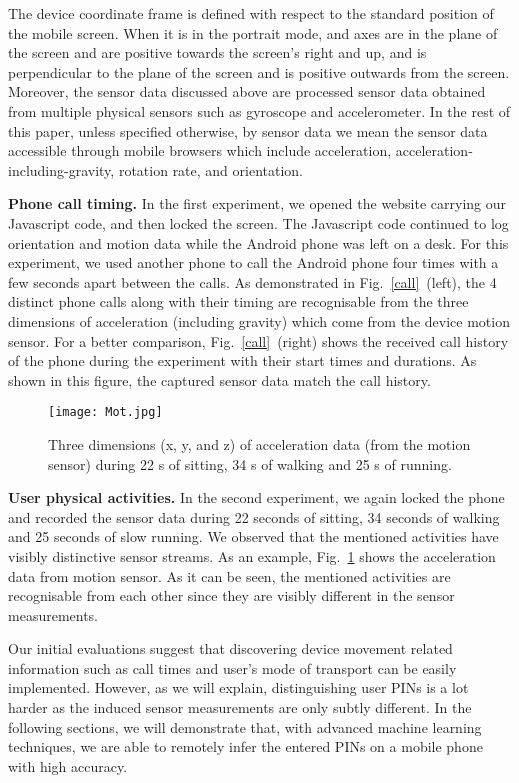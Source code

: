 \documentclass[10pt,twocolumn]{article}
\begin{document}
The device coordinate frame is defined with respect to the standard position of the mobile screen. When it is in the portrait mode,  and  axes are in the plane of the screen and are positive towards the screen's right and up, and  is perpendicular to the plane of the screen and is positive outwards from the screen.  
Moreover, the sensor data discussed above are processed sensor data obtained from multiple physical sensors such as gyroscope and accelerometer. 
In the rest of this paper, unless specified otherwise, by sensor data we mean the sensor data accessible through mobile browsers which include acceleration, acceleration-including-gravity, rotation rate, and orientation.  

\textbf{Phone call timing.}
In the first experiment, we opened the website carrying our Javascript code, and then locked the screen. The Javascript code continued to log orientation and motion data while the Android phone was left on a desk. For this experiment, we used another phone to call the Android phone four times with a few seconds apart between the calls. As demonstrated in Fig.~\ref{call}~(left), the 4 distinct phone calls along with their timing are recognisable from the three dimensions of acceleration (including gravity) which come from the device motion sensor. 
For a better comparison, Fig.~\ref{call}~(right) shows the received call history of the phone during the experiment with their start times and durations. 
As shown in this figure, the captured sensor data match the call history. 

\begin{figure}[t]
	\centering
	\texttt{[image: Mot.jpg]}
	\caption{Three dimensions (x, y, and z) of acceleration data (from the motion sensor) during 22 s of sitting, 34 s of walking and 25 s of running.} 
	\label{sitting}
\end{figure}
\textbf{User physical activities.}
In the second experiment, we again locked the phone and recorded the sensor data during 22 seconds of sitting, 34 seconds of walking and 25 seconds of slow running. We observed that the mentioned activities have visibly distinctive sensor streams. As an example, Fig.~\ref{sitting} shows the acceleration data from motion sensor. As it can be seen, the mentioned activities are recognisable from each other since they are visibly different in the sensor measurements.  

Our initial evaluations suggest that discovering device movement related information such as call times and user's mode of transport can be easily implemented. 
However, as we will explain, distinguishing user PINs is a lot harder as the induced sensor measurements are only subtly different. In the following sections, we will demonstrate that, with advanced machine learning techniques, we are able to remotely infer the entered PINs on a mobile phone with high accuracy.
\end{document}
